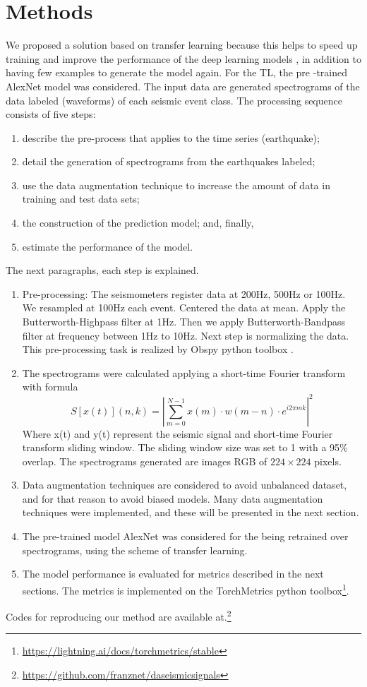 \documentclass[journal]{IEEEtran}
\begin{document}
\section{Methods}
We proposed a solution based on transfer learning because this helps to speed up training and improve the performance of the deep learning models \cite{titos2019classification,bueno2019volcano}, in addition to having few examples to generate the model again. For the TL, the pre -trained AlexNet\cite{krizhevsky2012imagenet} model was considered.
The input data are generated spectrograms of the data labeled (waveforms) of each seismic event class. The processing sequence consists of five steps:
\begin{enumerate}
 \item describe the pre-process that applies to the time series (earthquake);
 \item detail the generation of spectrograms from the earthquakes labeled;
 \item use the data augmentation technique to increase the amount of data in training and test data sets;
 \item the construction of the prediction model; and, finally,
 \item estimate the performance of the model.
\end{enumerate}
The next paragraphs, each step is explained.
\begin{enumerate}
	\item Pre-processing: The seismometers register data at 200Hz, 500Hz or 100Hz. We resampled at 100Hz each event. Centered the data at mean. Apply the Butterworth-Highpass filter at 1Hz. Then we apply Butterworth-Bandpass filter at frequency between 1Hz to 10Hz. Next step is normalizing the data. This pre-processing task is realized by Obspy python toolbox \cite{beyreuther2010obspy}.
	\item The spectrograms were calculated applying a short-time Fourier transform with formula
$$
S[x(t)](n,k)=\left|\sum_{m=0}^{N-1}x(m)\cdot w(m-n)\cdot e^{i2\pi mk}\right|^2$$
Where x(t) and y(t) represent the seismic signal and short-time Fourier transform sliding window. The sliding window size was set to 1 with a 95\% overlap. The spectrograms generated are images RGB of $224\times224$ pixels.
	\item Data augmentation techniques are considered to avoid unbalanced dataset, and for that reason to avoid biased models. Many data augmentation techniques were implemented, and these will be presented in the next section.
	\item The pre-trained model AlexNet\cite{krizhevsky2012imagenet} was considered for the being retrained over spectrograms, using the scheme of transfer learning.
	\item The model performance is evaluated for metrics described in the next sections. The metrics is implemented on the TorchMetrics python toolbox\footnote{\href{https://lightning.ai/docs/torchmetrics/stable}{\color{blue}https://lightning.ai/docs/torchmetrics/stable}}.
\end{enumerate}
Codes for reproducing our method are available at.\footnote{\href{https://github.com/franznet/daseismicsignals}{\color{blue}https://github.com/franznet/daseismicsignals}}
\end{document}
